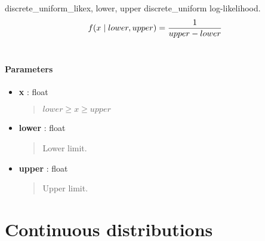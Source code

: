 \hypertarget{pymc.distributions.discrete_uniform_like}{}\begin{funcdesc}{discrete\_uniform\_like}{x, lower, upper}
discrete\_uniform log-likelihood.
\begin{gather}
\begin{split}f(x \mid lower, upper) = \frac{1}{upper-lower}\end{split}\notag\\\begin{split}\end{split}\notag
\end{gather}
\paragraph{Parameters}
\begin{itemize}
\item[] \textbf{x} : float
\begin{quote}

$lower \geq x \geq upper$
\end{quote}

\item[] \textbf{lower} : float
\begin{quote}

Lower limit.
\end{quote}

\item[] \textbf{upper} : float
\begin{quote}

Upper limit.
\end{quote}
\end{itemize}
\end{funcdesc}


\section{Continuous distributions}

